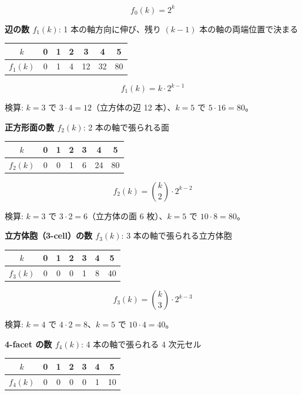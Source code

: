 \documentclass[
  a4paper,11pt]{ltjsarticle}
\newcounter{none}
\theoremstyle{definition}
\theoremstyle{remark}
\begin{document}
\[f_0(k) = 2^k\]

\textbf{辺の数 \(f_1(k)\)}: 1 本の軸方向に伸び、残り \((k-1)\)
本の軸の両端位置で決まる

{\def\LTcaptype{none} %
\begin{longtable}[]{@{}ccccccc@{}}
\toprule\noalign{}
\(k\) & 0 & 1 & 2 & 3 & 4 & 5 \\
\midrule\noalign{}
\endhead
\bottomrule\noalign{}
\endlastfoot
\(f_1(k)\) & 0 & 1 & 4 & 12 & 32 & 80 \\
\end{longtable}
}

\[f_1(k) = k \cdot 2^{k-1}\]

検算: \(k=3\) で \(3 \cdot 4 = 12\)（立方体の辺 12 本）、\(k=5\) で
\(5 \cdot 16 = 80\)。

\textbf{正方形面の数 \(f_2(k)\)}: 2 本の軸で張られる面

{\def\LTcaptype{none} %
\begin{longtable}[]{@{}ccccccc@{}}
\toprule\noalign{}
\(k\) & 0 & 1 & 2 & 3 & 4 & 5 \\
\midrule\noalign{}
\endhead
\bottomrule\noalign{}
\endlastfoot
\(f_2(k)\) & 0 & 0 & 1 & 6 & 24 & 80 \\
\end{longtable}
}

\[f_2(k) = \binom{k}{2} \cdot 2^{k-2}\]

検算: \(k=3\) で \(3 \cdot 2 = 6\)（立方体の面 6 枚）、\(k=5\) で
\(10 \cdot 8 = 80\)。

\textbf{立方体胞（3-cell）の数 \(f_3(k)\)}: 3 本の軸で張られる立方体胞

{\def\LTcaptype{none} %
\begin{longtable}[]{@{}ccccccc@{}}
\toprule\noalign{}
\(k\) & 0 & 1 & 2 & 3 & 4 & 5 \\
\midrule\noalign{}
\endhead
\bottomrule\noalign{}
\endlastfoot
\(f_3(k)\) & 0 & 0 & 0 & 1 & 8 & 40 \\
\end{longtable}
}

\[f_3(k) = \binom{k}{3} \cdot 2^{k-3}\]

検算: \(k=4\) で \(4 \cdot 2 = 8\)、\(k=5\) で \(10 \cdot 4 = 40\)。

\textbf{4-facet の数 \(f_4(k)\)}: 4 本の軸で張られる 4 次元セル

{\def\LTcaptype{none} %
\begin{longtable}[]{@{}ccccccc@{}}
\toprule\noalign{}
\(k\) & 0 & 1 & 2 & 3 & 4 & 5 \\
\midrule\noalign{}
\endhead
\bottomrule\noalign{}
\endlastfoot
\(f_4(k)\) & 0 & 0 & 0 & 0 & 1 & 10 \\
\end{longtable}
}
\end{document}

